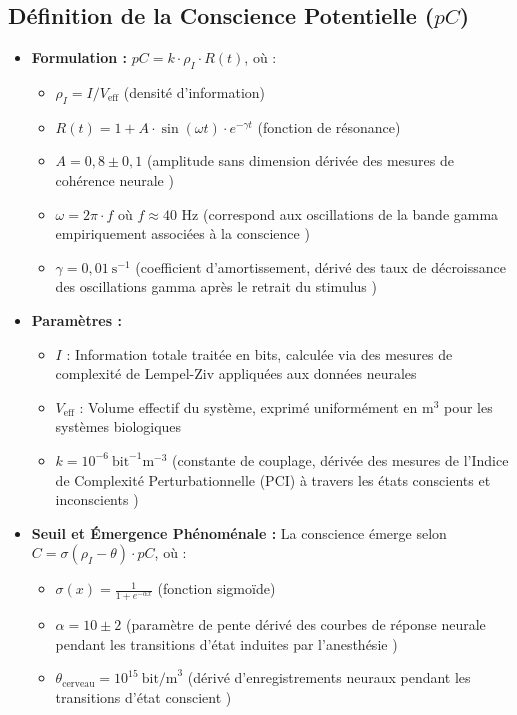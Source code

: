 \documentclass[12pt]{article}
\begin{document}
\subsection{Définition de la Conscience Potentielle ($pC$)}
\begin{itemize}
    \item \textbf{Formulation :} $pC = k \cdot \rho_I \cdot R(t)$, où :
    \begin{itemize}
        \item $\rho_I = I / V_{\text{eff}}$ (densité d'information)
        \item $R(t) = 1 + A \cdot \sin(\omega t) \cdot e^{-\gamma t}$ (fonction de résonance)
        \item $A = 0,8 \pm 0,1$ (amplitude sans dimension dérivée des mesures de cohérence neurale \cite{melloni2007})
        \item $\omega = 2\pi \cdot f$ où $f \approx 40$ Hz (correspond aux oscillations de la bande gamma empiriquement associées à la conscience \cite{crick1990,dehaene2011})
        \item $\gamma = 0,01~\text{s}^{-1}$ (coefficient d'amortissement, dérivé des taux de décroissance des oscillations gamma après le retrait du stimulus \cite{buzsaki2004,fries2015})
    \end{itemize}
    
    \item \textbf{Paramètres :} 
    \begin{itemize}[label=--]
        \item $I$ : Information totale traitée en bits, calculée via des mesures de complexité de Lempel-Ziv appliquées aux données neurales \cite{schartner2015}
        \item $V_{\text{eff}}$ : Volume effectif du système, exprimé uniformément en $\text{m}^3$ pour les systèmes biologiques
        \item $k = 10^{-6}~\text{bit}^{-1}\text{m}^{-3}$ (constante de couplage, dérivée des mesures de l'Indice de Complexité Perturbationnelle (PCI) à travers les états conscients et inconscients \cite{casali2013,casarotto2016})
    \end{itemize}
    
    \item \textbf{Seuil et Émergence Phénoménale :} La conscience émerge selon $C = \sigma(\rho_I - \theta) \cdot pC$, où :
    \begin{itemize}[label=--]
        \item $\sigma(x) = \frac{1}{1 + e^{-\alpha x}}$ (fonction sigmoïde)
        \item $\alpha = 10 \pm 2$ (paramètre de pente dérivé des courbes de réponse neurale pendant les transitions d'état induites par l'anesthésie \cite{chennu2014,storm2017})
        \item $\theta_{\text{cerveau}} = 10^{15}~\text{bit/m}^3$ (dérivé d'enregistrements neuraux pendant les transitions d'état conscient \cite{tononi2016,mashour2020})
    \end{itemize}
\end{itemize}
\end{document}
